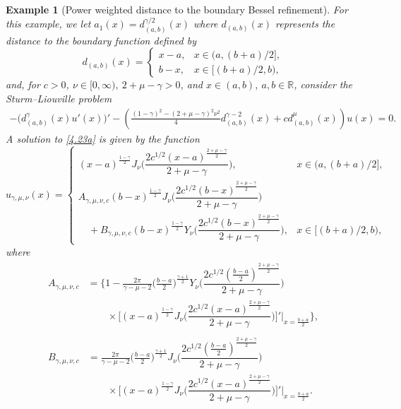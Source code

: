 \documentclass[reqno,10pt,centertags]{amsart}
\newcommand{\bbR}{{\mathbb{R}}}
\newcommand{\g}{\gamma}
\numberwithin{equation}{section}
\newtheorem{example}[theorem]{Example}
\theoremstyle{remark}
\begin{document}
\begin{example}[Power weighted distance to the boundary Bessel refinement]\label{ex4.3} 
For this example, we let $a_1(x)=d^{\g/2}_{(a,b)}(x)$ where $d_{(a,b)}(x)$ represents the distance to the boundary function defined by
\begin{equation}\label{4.22a}
d_{(a,b)}(x)=\begin{cases}
x-a,& x\in(a,(b+a)/2],\\
b-x,& x\in[(b+a)/2,b),
\end{cases}
\end{equation}
and, for $c>0$, $\nu\in[0,\infty),\ 2+\mu-\g>0$, and $x\in(a,b),\ a,b\in\bbR$, consider the Sturm--Liouville problem
\begin{align}\label{4.23a}
-\big(d^\g_{(a,b)}(x) u'(x)\big)'-\left(\frac{(1-\g)^2-(2+\mu-\g)^2\nu^2}{4}d^{\g-2}_{(a,b)}(x)+c d^\mu_{(a,b)}(x)\right)u(x)=0.
\end{align}
A solution to \eqref{4.23a} is given by the function
\begin{equation}\label{4.24a}
u_{\g,\mu,\nu}(x)=\begin{cases}
(x-a)^{\frac{1-\g}{2}}J_\nu\bigg(\dfrac{2c^{1/2} (x-a)^{\frac{2+\mu-\g}{2}}}{2+\mu-\g}\bigg),& x\in(a,(b+a)/2],\\[4mm]
A_{\g,\mu,\nu,c}(b-x)^{\frac{1-\g}{2}}J_\nu\bigg(\dfrac{2c^{1/2} (b-x)^{\frac{2+\mu-\g}{2}}}{2+\mu-\g}\bigg)\\[4mm]
\quad+B_{\g,\mu,\nu,c}(b-x)^{\frac{1-\g}{2}}Y_\nu\bigg(\dfrac{2c^{1/2} (b-x)^{\frac{2+\mu-\g}{2}}}{2+\mu-\g}\bigg),& x\in[(b+a)/2,b),
\end{cases}
\end{equation}
where
\begin{align}
\begin{split}
A_{\g,\mu,\nu,c}&=\Bigg\{1-\frac{2\pi}{\g-\mu-2}\bigg(\frac{b-a}{2}\bigg)^{\frac{\g+1}{2}} Y_\nu\bigg(\dfrac{2c^{1/2} (\frac{b-a}{2})^{\frac{2+\mu-\g}{2}}}{2+\mu-\g}\bigg)\\
&\qquad \times\Bigg[(x-a)^{\frac{1-\g}{2}}J_\nu\bigg(\dfrac{2c^{1/2} (x-a)^{\frac{2+\mu-\g}{2}}}{2+\mu-\g}\bigg)\Bigg]'\Bigg|_{x=\frac{b+a}{2}}\Bigg\},
\end{split}\\
\begin{split}
B_{\g,\mu,\nu,c}&=\frac{2\pi}{\g-\mu-2}\bigg(\frac{b-a}{2}\bigg)^{\frac{\g+1}{2}} J_\nu\bigg(\dfrac{2c^{1/2} (\frac{b-a}{2})^{\frac{2+\mu-\g}{2}}}{2+\mu-\g}\bigg)\\
&\qquad \times\Bigg[(x-a)^{\frac{1-\g}{2}}J_\nu\bigg(\dfrac{2c^{1/2} (x-a)^{\frac{2+\mu-\g}{2}}}{2+\mu-\g}\bigg)\Bigg]'\Bigg|_{x=\frac{b+a}{2}}.

\end{split}
\end{align}
\end{example}
\end{document}
